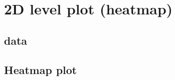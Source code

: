 \documentclass[../note.tex]{subfiles} %
\begin{document}
\section{2D level plot (heatmap)}
\subsection{data}

\subsection{Heatmap plot}
\end{document}
